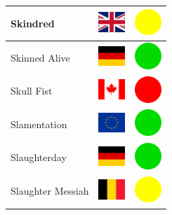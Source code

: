 \documentclass[12pt, a4paper, twoside]{report}
\begin{document}
\begin{center}
\begin{longtable}{|p{5cm}|p{2cm}|p{2cm}|}
 Skindred                                                   & \includegraphics[width=1cm]{../4x3/gb} &   \includegraphics[width=1cm]{../likes/m} \\ \hline
 Skinned Alive                                              & \includegraphics[width=1cm]{../4x3/de} &   \includegraphics[width=1cm]{../likes/y} \\ \hline
 Skull Fist                                                 & \includegraphics[width=1cm]{../4x3/ca} &   \includegraphics[width=1cm]{../likes/n} \\ \hline
 Slamentation                                               & \includegraphics[width=1cm]{../4x3/eu} &   \includegraphics[width=1cm]{../likes/y} \\ \hline
 Slaughterday                                               & \includegraphics[width=1cm]{../4x3/de} &   \includegraphics[width=1cm]{../likes/y} \\ \hline
 Slaughter Messiah                                          & \includegraphics[width=1cm]{../4x3/be} &   \includegraphics[width=1cm]{../likes/m} \\ \hline

\end{longtable}
\end{center}
\end{document}
